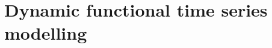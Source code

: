 
\chapter{Dynamic functional time series modelling \label{cha:dftsm}}  %

\ifpdf
    \graphicspath{{Chapter4/Figs/Raster/}{Chapter4/Figs/PDF/}{Chapter4/Figs/}}
\else
    \graphicspath{{Chapter4/Figs/Vector/}{Chapter4/Figs/}}
\fi
